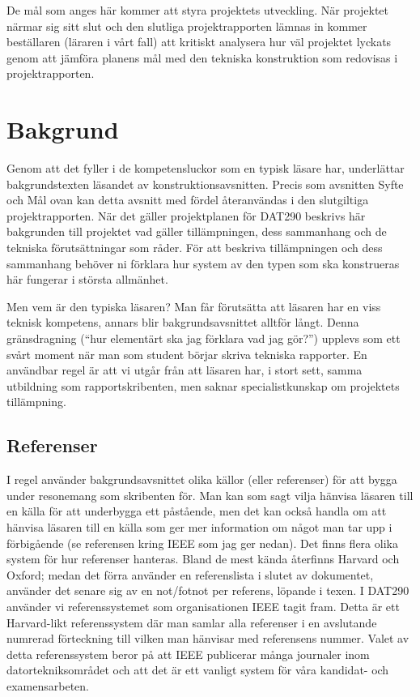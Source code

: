 \documentclass[a4paper]{article}
\begin{document}
De mål som anges här kommer att styra projektets utveckling. När
projektet närmar sig sitt slut och den slutliga projektrapporten lämnas
in kommer beställaren (läraren i vårt fall) att kritiskt analysera hur
väl projektet lyckats genom att jämföra planens mål med den tekniska
konstruktion som redovisas i projektrapporten.



\section {Bakgrund}


Genom att det fyller i de kompetensluckor som en typisk läsare har,
underlättar bakgrundstexten läsandet av konstruktionsavsnitten. Precis
som avsnitten Syfte och Mål ovan kan detta avsnitt med fördel
återanvändas i den slutgiltiga projektrapporten. När det gäller
projektplanen för DAT290 beskrivs här bakgrunden till projektet vad
gäller tillämpningen, dess sammanhang och de tekniska förutsättningar
som råder. För att beskriva tillämpningen och dess sammanhang behöver ni
förklara hur system av den typen som ska konstrueras här fungerar i
största allmänhet.

Men vem är den typiska läsaren? Man får förutsätta att läsaren har en
viss teknisk kompetens, annars blir bakgrundsavsnittet alltför långt.
Denna gränsdragning (“hur elementärt ska jag förklara vad jag gör?”)
upplevs som ett svårt moment när man som student börjar skriva tekniska
rapporter. En användbar regel är att vi utgår från att läsaren har, i
stort sett, samma utbildning som rapportskribenten, men saknar
specialistkunskap om projektets tillämpning.


\subsection {Referenser}

I regel använder bakgrundsavsnittet olika källor (eller referenser) för
att bygga under resonemang som skribenten för. Man kan som sagt vilja
hänvisa läsaren till en källa för att underbygga ett påstående, men det
kan också handla om att hänvisa läsaren till en källa som ger mer
information om något man tar upp i förbigående (se referensen kring IEEE
som jag ger nedan). Det finns flera olika system för hur referenser
hanteras. Bland de mest kända återfinns Harvard och Oxford; medan det
förra använder en referenslista i slutet av dokumentet, använder det
senare sig av en not/fotnot per referens, löpande i texen. I DAT290
använder vi referenssystemet som organisationen IEEE tagit fram\cite{hughen}. Detta
är ett Harvard-likt referenssystem där man samlar alla referenser i en
avslutande numrerad förteckning till vilken man hänvisar med referensens
nummer. Valet av detta referenssystem beror på att IEEE publicerar många
journaler inom datortekniksområdet och att det är ett vanligt system för
våra kandidat- och examensarbeten.
\end{document}
